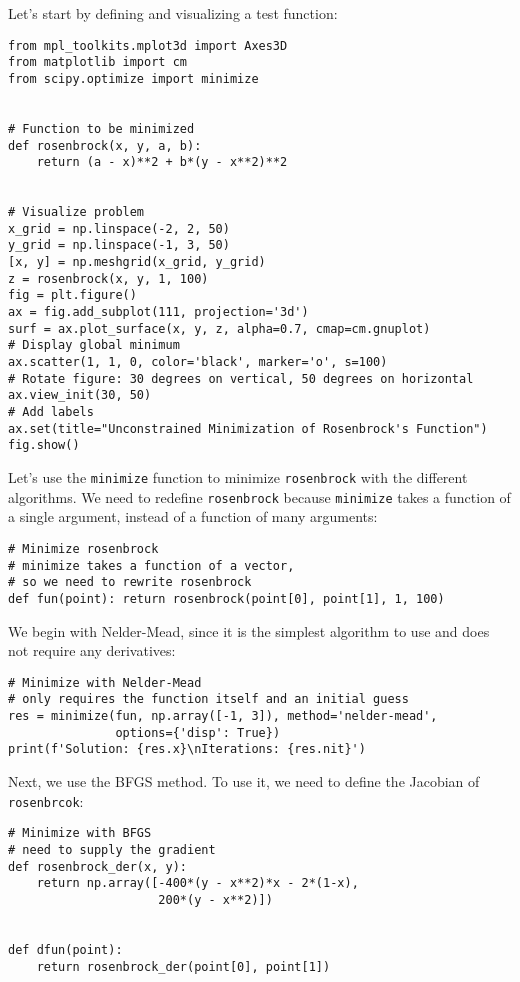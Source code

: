 \documentclass[12pt, a4paper]{article}
\begin{document}
Let's start by defining and visualizing a test function:
\lstset{language=jupyter-python,label= ,caption= ,captionpos=b,numbers=none}
\begin{lstlisting}
from mpl_toolkits.mplot3d import Axes3D
from matplotlib import cm
from scipy.optimize import minimize


# Function to be minimized
def rosenbrock(x, y, a, b):
    return (a - x)**2 + b*(y - x**2)**2


# Visualize problem
x_grid = np.linspace(-2, 2, 50)
y_grid = np.linspace(-1, 3, 50)
[x, y] = np.meshgrid(x_grid, y_grid)
z = rosenbrock(x, y, 1, 100)
fig = plt.figure()
ax = fig.add_subplot(111, projection='3d')
surf = ax.plot_surface(x, y, z, alpha=0.7, cmap=cm.gnuplot)
# Display global minimum
ax.scatter(1, 1, 0, color='black', marker='o', s=100)
# Rotate figure: 30 degrees on vertical, 50 degrees on horizontal
ax.view_init(30, 50)
# Add labels
ax.set(title="Unconstrained Minimization of Rosenbrock's Function")
fig.show()
\end{lstlisting}

Let's use the \texttt{minimize} function to minimize \texttt{rosenbrock} with the different algorithms.
We need to redefine \texttt{rosenbrock} because \texttt{minimize} takes a function of a single argument, instead of a function of many arguments:
\lstset{language=jupyter-python,label= ,caption= ,captionpos=b,numbers=none}
\begin{lstlisting}
# Minimize rosenbrock
# minimize takes a function of a vector,
# so we need to rewrite rosenbrock
def fun(point): return rosenbrock(point[0], point[1], 1, 100)
\end{lstlisting}

We begin with Nelder-Mead, since it is the simplest algorithm to use and does not require any derivatives:
\lstset{language=jupyter-python,label= ,caption= ,captionpos=b,numbers=none}
\begin{lstlisting}
# Minimize with Nelder-Mead
# only requires the function itself and an initial guess
res = minimize(fun, np.array([-1, 3]), method='nelder-mead',
               options={'disp': True})
print(f'Solution: {res.x}\nIterations: {res.nit}')
\end{lstlisting}

Next, we use the BFGS method. To use it, we need to define the Jacobian of \texttt{rosenbrcok}:
\lstset{language=jupyter-python,label= ,caption= ,captionpos=b,numbers=none}
\begin{lstlisting}
# Minimize with BFGS
# need to supply the gradient
def rosenbrock_der(x, y):
    return np.array([-400*(y - x**2)*x - 2*(1-x),
                     200*(y - x**2)])


def dfun(point):
    return rosenbrock_der(point[0], point[1])
\end{lstlisting}
\end{document}
